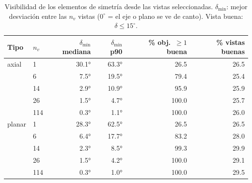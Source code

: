 \begin{table}[htbp]
\centering
\small
\caption{Visibilidad de los elementos de simetría desde las vistas seleccionadas. $\delta_{\min}$: mejor desviación entre las $n_v$ vistas ($0^\circ$ = el eje o plano se ve de canto). Vista buena: $\delta \leq 15^\circ$.}
\label{tab:visibilidad}
\begin{tabular}{llrrrr}
\toprule
Tipo & $n_v$ & $\delta_{\min}$ mediana & $\delta_{\min}$ p90 & \% obj.\ $\geq 1$ buena & \% vistas buenas \\
\midrule
axial & 1 & 30.1° & 63.3° & 26.5 & 26.5 \\
 & 6 & 7.5° & 19.5° & 79.4 & 25.4 \\
 & 14 & 2.9° & 10.9° & 95.9 & 25.9 \\
 & 26 & 1.5° & 4.7° & 100.0 & 25.7 \\
 & 114 & 0.3° & 1.1° & 100.0 & 26.0 \\
\midrule
planar & 1 & 28.3° & 62.5° & 26.5 & 26.5 \\
 & 6 & 6.4° & 17.7° & 83.2 & 28.0 \\
 & 14 & 2.3° & 8.5° & 99.3 & 29.9 \\
 & 26 & 1.5° & 4.2° & 100.0 & 29.1 \\
 & 114 & 0.3° & 1.0° & 100.0 & 29.5 \\
\bottomrule
\end{tabular}
\end{table}
